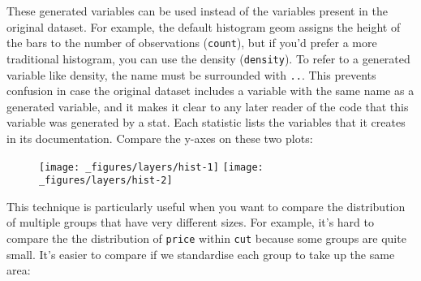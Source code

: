 These generated variables can be used instead of the variables present
in the original dataset. For example, the default histogram geom assigns
the height of the bars to the number of observations (\texttt{count}),
but if you'd prefer a more traditional histogram, you can use the
density (\texttt{density}). To refer to a generated variable like
density, the name must be surrounded with \texttt{..}. This prevents
confusion in case the original dataset includes a variable with the same
name as a generated variable, and it makes it clear to any later reader
of the code that this variable was generated by a stat. Each statistic
lists the variables that it creates in its documentation. 
Compare the y-axes on these two plots:

\begin{Shaded}
\begin{Highlighting}[]
\StringTok{ }
\StringTok{  }\NormalTok{(} \NormalTok{)}
\StringTok{ }
\StringTok{  }\NormalTok{(}\NormalTok{(}  \NormalTok{)}
\end{Highlighting}
\end{Shaded}

\begin{figure}[H]
  \texttt{[image: \_figures/layers/hist-1]}%
  \texttt{[image: \_figures/layers/hist-2]}
\end{figure}

This technique is particularly useful when you want to compare the
distribution of multiple groups that have very different sizes. For
example, it's hard to compare the the distribution of \texttt{price}
within \texttt{cut} because some groups are quite small. It's easier to
compare if we standardise each group to take up the same area:

\begin{Shaded}
\begin{Highlighting}[]
 \StringTok{ }
\StringTok{  }\NormalTok{(} \NormalTok{) +}
\StringTok{  }\NormalTok{(} \NormalTok{)}

 \StringTok{ }
\StringTok{  }\NormalTok{(}\NormalTok{(}  \NormalTok{) +}\StringTok{ }
\StringTok{  }\NormalTok{(} \NormalTok{)}
\end{Highlighting}
\end{Shaded}

